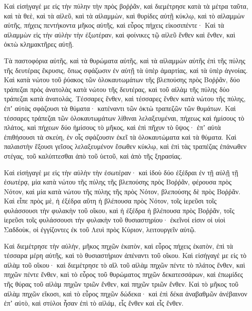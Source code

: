 {\par }{\PP {}Καὶ εἰσήγαγέ με εἰς τὴν πύλην τὴν πρὸς βοῤῥᾶν, καὶ διεμέτρησε κατὰ τὰ μέτρα ταῦτα,
καὶ τὰ θεὲ, καὶ τὰ αἰλεῦ, καὶ τὰ αἰλαμμὼν, καὶ θυρίδες αὐτῇ κύκλῳ, καὶ τὸ αἰλαμμὼν αὐτῆς, πήχεις πεντήκοντα μῆκος αὐτῆς, καὶ εὖρος πήχεις εἰκοσιπέντε·
Καὶ τὰ αἰλαμμὼν εἰς τὴν αὐλὴν τὴν ἐξωτέραν, καὶ φοίνικες τῷ αἰλεῦ ἔνθεν καὶ ἔνθεν, καὶ ὀκτὼ κλημακτῆρες αὐτῇ.
\par }{\PP {}Τὰ παστοφόρια αὐτῆς, καὶ τὰ θυρώματα αὐτῆς, καὶ τὰ αἰλαμμὼν αὐτῆς ἐπὶ τῆς πύλης τῆς δευτέρας ἔκρυσις,
ὅπως σφάζωσιν ἐν αὐτῇ τὰ ὑπὲρ ἁμαρτίας, καὶ τὰ ὑπὲρ ἀγνοίας.
Καὶ κατὰ νώτου τοῦ ῥύακος τῶν ὁλοκαυτωμάτων τῆς βλεπούσης πρὸς Βοῤῥᾶν, δύο τράπεζαι πρὸς ἀνατολὰς κατὰ νώτου τῆς δευτέρας, καὶ τοῦ αἰλὰμ τῆς πύλης δύο τράπεζαι κατὰ ἀνατολάς.
Τέσσαρες ἔνθεν, καὶ τέσσαρες ἔνθεν κατὰ νώτου τῆς πύλης, ἐπʼ αὐτὰς σφάζουσι τὰ θύματα· κατέναντι τῶν ὀκτὼ τραπεζῶν τῶν θυμάτων.
Καὶ τέσσαρες τράπεζαι τῶν ὁλοκαυτωμάτων λίθιναι λελαξευμέναι, πήχεως καὶ ἡμίσους τὸ πλάτος, καὶ πήχεων δύο ἡμίσους τὸ μῆκος, καὶ ἐπὶ πῆχυν τὸ ὕψος· ἐπʼ αὐτὰ ἐπιθήσουσι τὰ σκεύη, ἑν οἷς σφάζουσιν ἐκεῖ τὰ ὁλοκαυτώματα καὶ τὰ θύματα.
Καὶ παλαιστὴν ἕξουσι γεῖσος λελαξευμένον ἔσωθεν κύκλῳ, καὶ ἐπὶ τὰς τραπέζας ἐπάνωθεν στέγας, τοῦ καλύπτεσθαι ἀπὸ τοῦ ὑετοῦ, καὶ ἀπὸ τῆς ξηρασίας.
\par }{\PP {}Καὶ εἰσήγαγέ με εἰς τὴν αὐλὴν τὴν ἐσωτέραν· καὶ ἰδοὺ δύο ἐξέδραι ἐν τῇ αὐλῇ τῇ ἐσωτέρᾳ, μία κατὰ νώτου τῆς πύλης τῆς βλεπούσης πρὸς Βοῤῥᾶν, φέρουσα πρὸς Νότον, καὶ μία κατὰ νώτου τῆς πύλης τῆς πρὸς Νότον, βλεπούσης δὲ πρὸς Βοῤῥᾶν.
Καὶ εἶπε πρὸς μὲ, ἡ ἐξέδρα αὕτη ἡ βλέπουσα πρὸς Νότον, τοῖς ἱερεῦσι τοῖς φυλάσσουσι τὴν φυλακὴν τοῦ οἴκου,
καὶ ἡ ἐξέδρα ἡ βλέπουσα πρὸς Βοῤῥᾶν, τοῖς ἱερεῦσι τοῖς φυλάσσουσι τὴν φυλακὴν τοῦ θυσιαστηρίου· ἐκεῖνοί εἰσιν οἱ υἱοὶ Σαδδοὺκ, οἱ ἐγγίζοντες ἐκ τοῦ Λευὶ πρὸς Κύριον, λειτουργεῖν αὐτῷ.
\par }{\PP {}Καὶ διεμέτρησε τὴν αὐλὴν, μῆκος πηχῶν ἑκατὸν, καὶ εὖρος πήχεις ἑκατὸν, ἐπὶ τὰ τέσσαρα μέρη αὐτῆς, καὶ τὸ θυσιαστήριον ἀπέναντι τοῦ οἴκου.
Καὶ εἰσήγαγέ με εἰς τὸ αἰλὰμ τοῦ οἴκου· καὶ διεμέτρησε τὸ αἲλ τοῦ αἰλὰμ πηχῶν πέντε τὸ πλάτος ἔνθεν, καὶ πηχῶν πέντε ἔνθεν, καὶ τὸ εὖρος τοῦ θυρώματος πηχῶν δεκατεσσάρων, καὶ ἐπωμίδες τῆς θύρας τοῦ αἰλὰμ πηχῶν τριῶν ἔνθεν, καὶ πηχῶν τριῶν ἔνθεν.
Καὶ τὸ μῆκος τοῦ αἰλὰμ πηχῶν εἴκοσι, καὶ τὸ εὖρος πηχῶν δώδεκα· καὶ ἐπὶ δέκα ἀναβαθμῶν ἀνέβαινον ἐπʼ αὐτὸ, καὶ στύλοι ἦσαν ἐπὶ τὸ αἰλάμ, εἷς ἔνθεν καὶ εἷς ἔνθεν.

}
